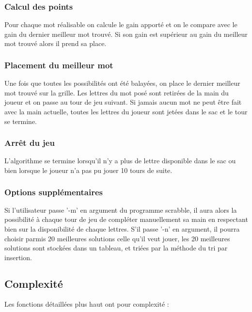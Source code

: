 \documentclass[a4paper,8pt,french,fleqn]{article}
\begin{document}
\subsubsection{Calcul des points}

Pour chaque mot réalisable on calcule le gain apporté et on le compare avec le gain du dernier meilleur mot trouvé. Si son gain est supérieur au gain du meilleur mot trouvé alors il prend sa place.

\subsubsection{Placement du meilleur mot}

Une fois que toutes les possibilités ont été balayées, on place le dernier meilleur mot trouvé sur la grille. Les lettres du mot posé sont retirées de la main du joueur et on passe au tour de jeu suivant. Si jamais aucun mot ne peut être fait avec la main actuelle, toutes les lettres du joueur sont jetées dans le sac et le tour se termine. 

\subsubsection{Arrêt du jeu}

L'algorithme se termine lorsqu'il n'y a plus de lettre disponible dans le sac ou bien lorsque le joueur n'a pas pu jouer 10 tours de suite.

\subsubsection{Options supplémentaires}

Si l'utilisateur passe '-m' en argument du programme scrabble, il aura alors la possibilité à chaque tour de jeu de compléter manuellement sa main en respectant bien sur la disponibilité de chaque lettres. S'il passe '-n' en argument, il pourra choisir parmis 20 meilleures solutions celle qu'il veut jouer, les 20 meilleures solutions sont stockées dans un tableau, et triées par la méthode du tri par insertion.

\subsection{Complexité}

Les fonctions détaillées plus haut ont pour complexité : \\
\end{document}
